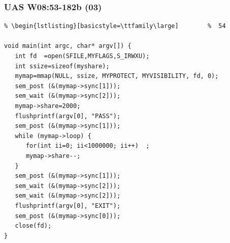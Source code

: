 \documentclass[aspectratio=169, xcolor=table, notheorems, hyperref={pdfpagelabels=false}]{beamer}
\begin{document}
\begin{frame}[fragile]
\frametitle{UAS W08:53-182b (03)}
\begin{lstlisting}[basicstyle=\ttfamily\footnotesize] %  72
% \begin{lstlisting}[basicstyle=\ttfamily\small]        %  65
% \begin{lstlisting}[basicstyle=\ttfamily\large]        %  54

void main(int argc, char* argv[]) {
   int fd  =open(SFILE,MYFLAGS,S_IRWXU);
   int ssize=sizeof(myshare);
   mymap=mmap(NULL, ssize, MYPROTECT, MYVISIBILITY, fd, 0);
   sem_post (&(mymap->sync[1]));
   sem_wait (&(mymap->sync[2]));
   mymap->share=2000;
   flushprintf(argv[0], "PASS");
   sem_post (&(mymap->sync[1]));
   while (mymap->loop) {
      for(int ii=0; ii<1000000; ii++)  ;
      mymap->share--;
   }
   sem_post (&(mymap->sync[1]));
   sem_wait (&(mymap->sync[2]));
   sem_wait (&(mymap->sync[2]));
   flushprintf(argv[0], "EXIT");
   sem_post (&(mymap->sync[0]));
   close(fd);
}

\end{lstlisting}
\end{frame}

\end{document}
